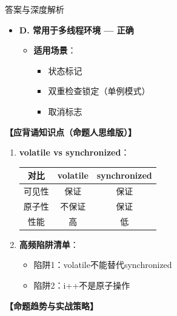 \documentclass[12pt, a4paper]{ctexart}
\begin{document}
\begin{enumerate}[label=\textbf{\arabic*.}]
\begin{bluebox}{答案与深度解析}
\begin{itemize}[label={}, leftmargin=*, nosep]
		      \item \textbf{D. 常用于多线程环境 — 正确}
		      \begin{itemize}[label={}, leftmargin=*, nosep]
			      \item \textbf{适用场景}：
			            \begin{itemize}[label={}, nosep]
				            \item 状态标记
				            \item 双重检查锁定（单例模式）
				            \item 取消标志
			            \end{itemize}
		      \end{itemize}

		      \end{itemize}

		      \textbf{【应背诵知识点（命题人思维版）】}
		      \begin{enumerate}[leftmargin=*, nosep]
			      \item \textbf{volatile vs synchronized}：
			            \begin{tabular}{|c|c|c|}
				            \hline
				            \textbf{对比} & \textbf{volatile} & \textbf{synchronized} \\
				            \hline
				            可见性         & 保证                & 保证                    \\
				            \hline
				            原子性         & 不保证               & 保证                    \\
				            \hline
				            性能          & 高                 & 低                     \\
				            \hline
			            \end{tabular}

			      \item \textbf{高频陷阱清单}：
			            \begin{itemize}[label={}, nosep]
				            \item 陷阱1：volatile不能替代synchronized
				            \item 陷阱2：i++不是原子操作
			            \end{itemize}
		      \end{enumerate}

		      \textbf{【命题趋势与实战策略】}


\end{bluebox}
\end{enumerate}
\end{document}
